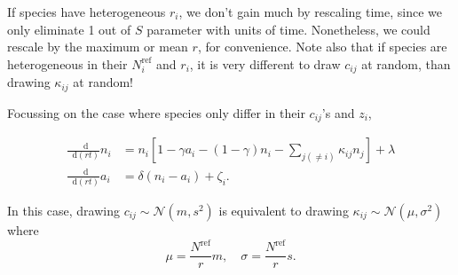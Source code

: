 \documentclass{article}
\newcommand{\diff}{\mathop{}\!\mathrm{d}}
\begin{document}
If species have heterogeneous $r_i$, we don't gain much by rescaling time, since we only eliminate 1 out of $S$ parameter with units of time. Nonetheless, we could rescale by the maximum or mean $r$, for convenience. Note also that if species are heterogeneous in their $N_i^\text{ref}$ and $r_i$, it is very different to draw $c_{ij}$ at random, than drawing $\kappa_{ij}$ at random!

Focussing on the case where species only differ in their $c_{ij}$'s and $z_i$,

\begin{subequations}\label{eqs}
\begin{align}
    \frac{\diff }{\diff (rt)} n_i &= n_i \left[ 1 - \gamma a_i - (1 - \gamma)n_i - \sum_{j(\neq i)}  \kappa_{ij} n_j   \right] + \lambda \\
    \frac{\diff }{\diff (rt)} a_i &= \delta (n_i - a_i) + \zeta_i.
\end{align}
\end{subequations}

In this case, drawing $c_{ij} \sim \mathcal{N}(m,s^2)$ is equivalent to drawing $\kappa_{ij} \sim \mathcal{N}(\mu,\sigma^2)$ where 
\begin{equation}
    \mu = \frac{N^\text{ref}}{r} m,\quad \sigma = \frac{N^\text{ref}}{r} s .
\end{equation}
\end{document}
